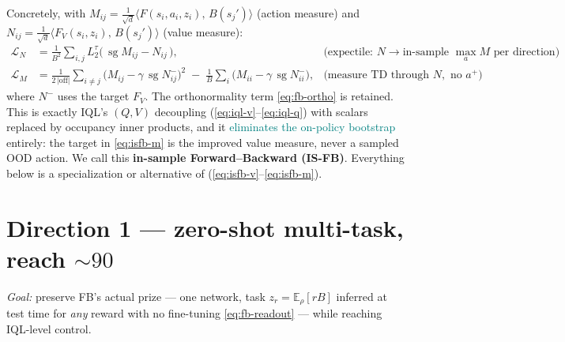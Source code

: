 \documentclass[11pt]{article}
\newcommand{\sg}{\operatorname{sg}}                 %
\newcommand{\E}{\mathbb{E}}
\newcommand{\inner}[2]{\langle #1,\, #2\rangle}
\newcommand{\Fmap}{F}                                %
\newcommand{\Bmap}{B}                                %
\newcommand{\Lexp}{L^{\tau}_2}                       %
\newcommand{\good}[1]{\textcolor{teal}{#1}}
\begin{document}
Concretely, with $M_{ij}=\tfrac1{\sqrt d}\inner{\Fmap(s_i,a_i,z_i)}{\Bmap(s_j')}$
(action measure) and $N_{ij}=\tfrac1{\sqrt d}\inner{\Fmap_V(s_i,z_i)}{\Bmap(s_j')}$
(value measure):
\begin{align}
  \mathcal{L}_{N}
    &= \frac{1}{B^2}\sum_{i,j}\Lexp\!\big(\,\sg M_{ij}-N_{ij}\,\big),
    &\text{(expectile: } N \to \text{in-sample }\max_a M\text{ per direction)}
    \label{eq:isfb-v}\\
  \mathcal{L}_{M}
    &= \frac{1}{2\,|\mathrm{off}|}\sum_{i\ne j}\!\big(M_{ij}-\gamma\,\sg N^{-}_{ij}\big)^{2}
       \;-\;\frac1B\sum_i\big(M_{ii}-\gamma\,\sg N^{-}_{ii}\big),
    &\text{(measure TD through } N,\text{ no } a^{+})
    \label{eq:isfb-m}
\end{align}
where $N^{-}$ uses the target $\Fmap_V$. The orthonormality term
\eqref{eq:fb-ortho} is retained. This is exactly IQL's $(Q,V)$ decoupling
(\ref{eq:iql-v}--\ref{eq:iql-q}) with scalars replaced by occupancy inner
products, and it \good{eliminates the on-policy bootstrap} entirely: the target
in \eqref{eq:isfb-m} is the improved value measure, never a sampled OOD action.
We call this \textbf{in-sample Forward--Backward (IS-FB)}. Everything below is a
specialization or alternative of (\ref{eq:isfb-v}--\ref{eq:isfb-m}).

\section{Direction 1 --- zero-shot multi-task, reach ${\sim}90$}

\emph{Goal:} preserve FB's actual prize --- one network, task $z_r=\E_\rho[r\Bmap]$
inferred at test time for \emph{any} reward with no fine-tuning
\eqref{eq:fb-readout} --- while reaching IQL-level control.
\end{document}
